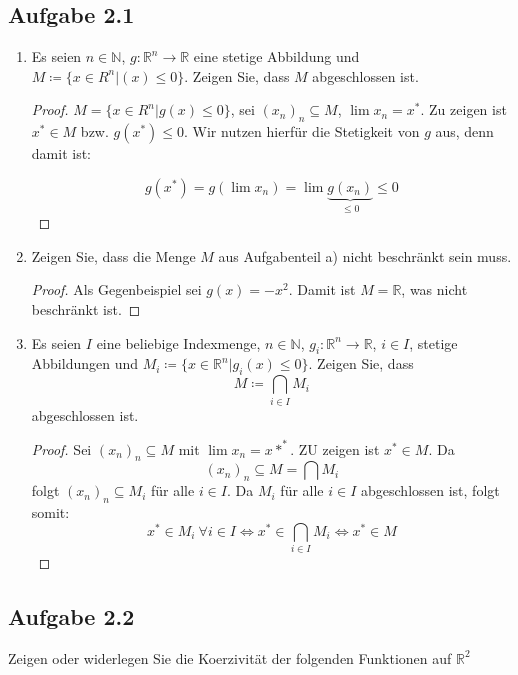 \documentclass[12pt]{extreport} %
\newcommand{\N}{\mathbb{N}}
\newcommand{\R}{\mathbb{R}}
\theoremstyle{named}
\theoremstyle{nnamed}
\theoremstyle{itshape}
\theoremstyle{normal}
\begin{document}
\newpage

\subsection*{Aufgabe 2.1}

\begin{enumerate}
	\item Es seien $n \in \N$, $g \colon \R^n \rightarrow \R$ eine stetige Abbildung und $M \coloneqq \{ x \in R^{n} | (x) \leq 0 \}$. Zeigen Sie, dass $M$ abgeschlossen ist.
		\begin{proof}
			$M = \{ x \in R^n | g(x) \leq 0 \}$, sei $(x_n)_n \subseteq M$, $\lim x_n = x^*$. Zu zeigen ist $x^* \in M$ bzw. $g(x^*) \leq 0$. Wir nutzen hierfür die Stetigkeit von $g$ aus, denn damit ist:
			
			$$ g(x^*) = g(\lim x_n ) = \lim \underbrace{g(x_n)}_{\leq 0} \leq 0 $$
		\end{proof}
	\item Zeigen Sie, dass die Menge $M$ aus Aufgabenteil a) nicht beschränkt sein muss.
		\begin{proof}
			Als Gegenbeispiel sei $g(x) = -x^2$. Damit ist $M = \R$, was nicht beschränkt ist.
		\end{proof}
	\item Es seien $I$ eine beliebige Indexmenge, $n \in \N$, $g_i \colon \R^n \rightarrow \R$, $i \in I$, stetige Abbildungen und $M_i \coloneqq \{ x \in \R^n | g_i(x) \leq 0 \}$. Zeigen Sie, dass 
		$$ M \coloneqq \bigcap_{i \in I} M_i $$
		abgeschlossen ist.
		\begin{proof}
			Sei $(x_n)_n \subseteq M$ mit $\lim x_n = x*^*$. ZU zeigen ist $x^* \in M$. Da 
				$$(x_n)_n \subseteq M= \bigcap M_i$$
				folgt $(x_n)_n \subseteq M_i$ für alle $i \in I$. Da $M_i$ für alle $i \in I$ abgeschlossen ist, folgt somit:
			$$ x^* \in M_i ~\forall i \in I \iff x^* \in \bigcap_{i \in I} M_i \iff x^* \in M $$
		\end{proof}
\end{enumerate}


\subsection*{Aufgabe 2.2}

Zeigen oder widerlegen Sie die Koerzivität der folgenden Funktionen auf $\R^2$
\end{document}
